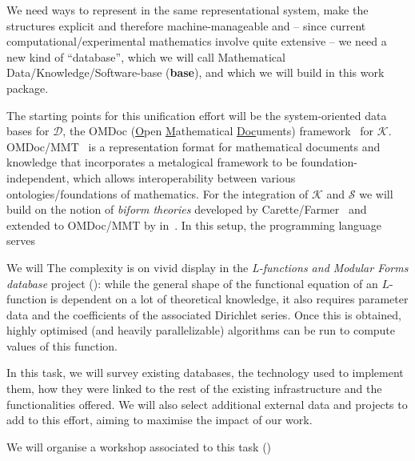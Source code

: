 \begin{workpackage}[id=dksbases,%
  title=Data/Knowledge/Software-Bases,lead=JU,
  ZHRM=12,JURM=46,UWRM=25,SARM=10,LLRM=2,PSRM=4]
\begin{wpdescription}
  We need ways to represent \DKS in the same representational system, make the \DKS
  structures explicit and therefore machine-manageable and -- since current
  computational/experimental mathematics involve quite extensive \DKS -- we need a new
  kind of ``database'', which we will call Mathematical Data/Knowledge/Software-base
  (\textbf{\DKS base}), and which we will build in this work package.

  The starting points for this unification effort will be the system-oriented data bases
  for $\mathcal{D}$, the OMDoc (\underline{O}pen \underline{M}athematical
  \underline{Doc}uments) framework~\cite{Kohlhase:OMDoc1.2} for $\mathcal{K}$.
  OMDoc/MMT~\cite{RabKoh:WSMSML13} is a representation format for mathematical documents
  and knowledge that incorporates a metalogical framework to be foundation-independent,
  which allows interoperability between various ontologies/foundations of mathematics. For
  the integration of $\mathcal{K}$ and $\mathcal{S}$ we will build on the notion of
  \emph{biform theories} developed by Carette/Farmer~\cite{btc07} and extended to
  OMDoc/MMT by  in~\cite{KohManRab:aumftg13}. In this setup, the programming
  language serves


 We will  The complexity is on vivid display in the \emph{L-functions and Modular Forms database}
  project (\LMFDB): while the general shape of the functional equation of an $L$-function
  is dependent on a lot of theoretical knowledge, it also requires parameter data and the
  coefficients of the associated Dirichlet series. Once this is obtained, highly optimised
  (and heavily parallelizable) algorithms can be run to compute values of this function.
\end{wpdescription}

\begin{tasklist}
\begin{task}[title={Survey of existing \DKS bases, Formulation of requirements},
  id=data-assessment,lead=ZH,partners={JU,SA,UW,US},wphases=0-3,PM=4]
  In this task, we will survey existing databases, the technology used to implement them,
  how they were linked to the rest of the existing infrastructure and the functionalities
  offered. We will also select additional external data and projects to add to this
  effort, aiming to maximise the impact of our work.

  We will organise a workshop associated to this task ()
\end{task}


\end{tasklist}
\end{workpackage}
